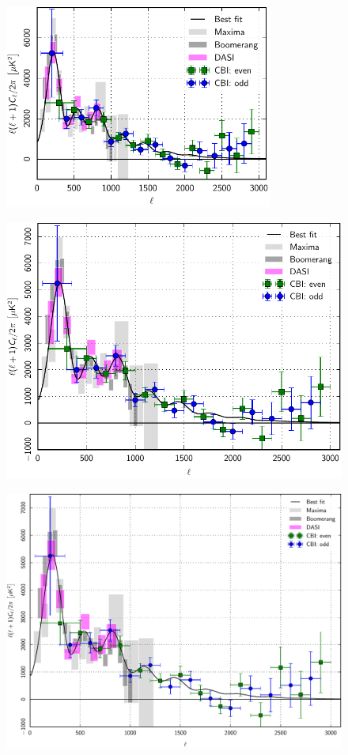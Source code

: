 \documentclass[traditabstract]{aa}
\begin{document}
\begin{figure}[ht]
\includegraphics[width=8.8cm]{PlanckFig_lineplot_python_88mm.pdf}
\caption{\fcaption} 
\end{figure}


\begin{figure}[ht]
\sidecaption
\includegraphics[width=12cm]{PlanckFig_lineplot_python_120mm.pdf}
\caption{\fcaption}
\end{figure}

\begin{figure}[t]
\includegraphics[width=18cm]{PlanckFig_lineplot_python_180mm.pdf}
\caption{\fcaption}
\end{figure}
\end{document}
